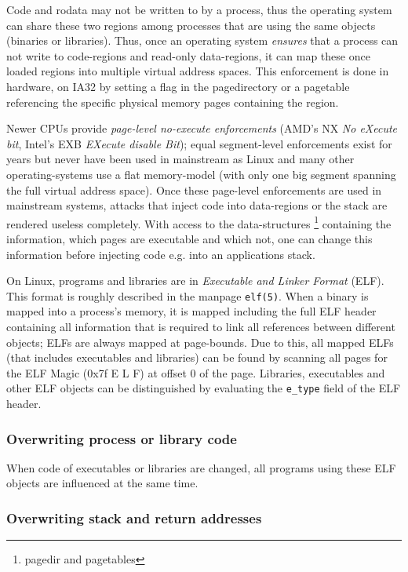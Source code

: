Code and rodata may not be written to by a process, thus the operating system
can share these two regions among processes that are using the same objects
(binaries or libraries).  Thus, once an operating system \emph{ensures} that a
process can not write to code-regions and read-only data-regions, it can map
these once loaded regions into multiple virtual address spaces. This enforcement
is done in hardware, on IA32 by setting a flag in the pagedirectory or a
pagetable referencing the specific physical memory pages containing the region.

Newer CPUs provide \emph{page-level no-execute enforcements} (AMD's NX \emph{No
eXecute bit}, Intel's EXB \emph{EXecute disable Bit}); equal segment-level
enforcements exist for years but never have been used in mainstream as Linux and
many other operating-systems use a flat memory-model (with only one big segment
spanning the full virtual address space).  Once these page-level enforcements
are used in mainstream systems, attacks that inject code into data-regions or
the stack are rendered useless completely. With access to the data-structures
\footnote{pagedir and pagetables} containing the information, which pages are
executable and which not, one can change this information before injecting code
e.g. into an applications stack. 

On Linux, programs and libraries are in \emph{Executable and Linker Format}
(ELF).  This format is roughly described in the manpage \texttt{elf(5)}. When a
binary is mapped into a process's memory, it is mapped including the full ELF
header containing all information that is required to link all references
between different objects; ELFs are always mapped at page-bounds. Due to this,
all mapped ELFs (that includes executables and libraries) can be found by
scanning all pages for the ELF Magic (0x7f E L F) at offset 0 of the page.
Libraries, executables and other ELF objects can be distinguished by evaluating
the \texttt{e\_type} field of the ELF header.

\subsubsection{Overwriting process or library code}

When code of executables or libraries are changed, all programs using these ELF
objects are influenced at the same time.

\subsubsection{Overwriting stack and return addresses}




